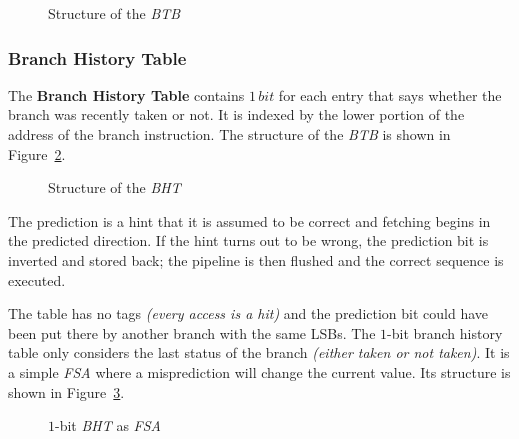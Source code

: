 \documentclass[english]{article}
\begin{document}
\begin{figure}[htbp]
  \bigskip
  \centering
  \caption{Structure of the \textit{BTB}}
  \label{fig:structure-of-BTB}
  \bigskip
\end{figure}

\subsubsection{Branch History Table}

The \textbf{Branch History Table} contains \(1 \, bit\) for each entry that says whether the branch was recently taken or not.
It is indexed by the lower portion of the address of the branch instruction.
The structure of the \textit{BTB} is shown in Figure~\ref{fig:structure-of-BHT}.

\begin{figure}[htbp]
  \bigskip
  \centering
  \caption{Structure of the \textit{BHT}}
  \label{fig:structure-of-BHT}
  \bigskip
\end{figure}

The prediction is a hint that it is assumed to be correct and fetching begins in the predicted direction.
If the hint turns out to be wrong, the prediction bit is inverted and stored back;
the pipeline is then flushed and the correct sequence is executed.

The table has no tags \textit{(every access is a hit)} and the prediction bit could have been put there by another branch with the same LSBs.
The \(1\)-bit branch history table only considers the last status of the branch \textit{(either taken or not taken)}.
It is a simple \textit{FSA} where a misprediction will change the current value.
Its structure is shown in Figure~\ref{fig:BHT-as-FSA}.

\begin{figure}[htbp]
  \bigskip
  \centering


  \caption{\(1\)-bit \textit{BHT} as \textit{FSA}}
  \label{fig:BHT-as-FSA}
  \bigskip
\end{figure}
\end{document}
